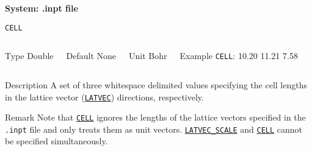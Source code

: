 \documentclass[xcolor=dvipsnames,t]{beamer}
\begin{document}
\begin{frame}[allowframebreaks,c]{} \label{System}

\begin{center}
\Huge \textbf{System: .inpt file}
\end{center}

\end{frame}



\begin{frame}[allowframebreaks]{\texttt{CELL}} \label{CELL}
\vspace*{-12pt}
\begin{columns}
\begin{block}{Type}
Double
\end{block}

\begin{block}{Default}
None
\end{block}

\begin{block}{Unit}
Bohr
\end{block}
    
\begin{block}{Example}
\texttt{CELL}: 10.20 11.21 7.58
\end{block}
\end{columns}
\begin{block}{Description}
A set of three whitespace delimited values specifying the cell lengths in the lattice vector (\hyperlink{LATVEC}{\texttt{LATVEC}}) directions, respectively.
\end{block}
\begin{block}{Remark}
    Note that \hyperlink{CELL}{\texttt{CELL}} ignores the lengths of the lattice vectors specified in the \texttt{.inpt} file and only treats them as unit vectors. \hyperlink{LATVEC_SCALE}{\texttt{LATVEC\_SCALE}} and \hyperlink{CELL}{\texttt{CELL}} cannot be specified simultaneously.
\end{block}

\end{frame}
\end{document}
